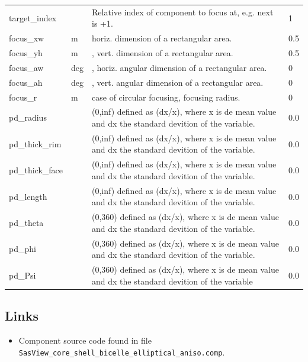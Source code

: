 \begin{longtable}{p{}p{}p{}p{}}
target\_index &   & Relative index of component to focus at, e.g. next is +1. & 1 \\
focus\_xw & m & horiz. dimension of a rectangular area. & 0.5 \\
focus\_yh & m & , vert. dimension of a rectangular area. & 0.5 \\
focus\_aw & deg & , horiz. angular dimension of a rectangular area. & 0 \\
focus\_ah & deg & , vert. angular dimension of a rectangular area. & 0 \\
focus\_r & m & case of circular focusing, focusing radius. & 0 \\
pd\_radius &  & (0,inf) defined as (dx/x), where x is de mean value and dx the standard devition of the variable. & 0.0 \\
pd\_thick\_rim &  & (0,inf) defined as (dx/x), where x is de mean value and dx the standard devition of the variable. & 0.0 \\
pd\_thick\_face &  & (0,inf) defined as (dx/x), where x is de mean value and dx the standard devition of the variable. & 0.0 \\
pd\_length &  & (0,inf) defined as (dx/x), where x is de mean value and dx the standard devition of the variable. & 0.0 \\
pd\_theta &  & (0,360) defined as (dx/x), where x is de mean value and dx the standard devition of the variable. & 0.0 \\
pd\_phi &  & (0,360) defined as (dx/x), where x is de mean value and dx the standard devition of the variable. & 0.0 \\
pd\_Psi &  & (0,360) defined as (dx/x), where x is de mean value and dx the standard devition of the variable & 0.0 \\
\bottomrule
\end{longtable}

\subsection*{Links}
\begin{itemize}
  \item Component source code found in file \texttt{SasView\_core\_shell\_bicelle\_elliptical\_aniso.comp}.
\end{itemize}
